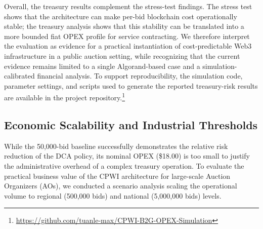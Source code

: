 \documentclass[runningheads]{llncs}
\begin{document}
Overall, the treasury results complement the stress-test findings. The stress test
shows that the architecture can make per-bid blockchain cost operationally
stable; the treasury analysis shows that this stability can be translated into a
more bounded fiat OPEX profile for service contracting. We therefore interpret
the evaluation as evidence for a practical instantiation of cost-predictable
Web3 infrastructure in a public auction setting, while recognizing that the
current evidence remains limited to a single Algorand-based case and a
simulation-calibrated financial analysis. To support reproducibility, the
simulation code, parameter settings, and scripts used to generate the reported
treasury-risk results are available in the project repository.\footnote{\url{https://github.com/tuanle-max/CPWI-B2G-OPEX-Simulation}}



\subsection{Economic Scalability and Industrial Thresholds}
While the 50,000-bid baseline successfully demonstrates the relative risk reduction of the DCA policy, its nominal OPEX (\$18.00) is too small to justify the administrative overhead of a complex treasury operation. To evaluate the practical business value of the CPWI architecture for large-scale Auction Organizers (AOs), we conducted a scenario analysis scaling the operational volume to regional (500,000 bids) and national (5,000,000 bids) levels.

\begin{table}[hbt!]
\centering
\caption{Treasury OPEX Risk Analysis Across Operational Scales (Base Price: \$0.12, Fee: 0.003 ALGO)}
\label{tab:scenario_analysis}
\end{table}
\end{document}
